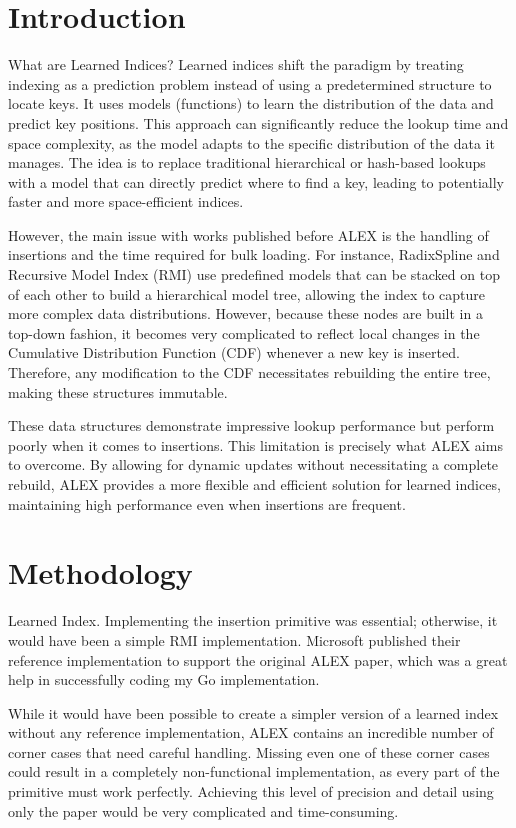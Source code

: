 \chapter{Introduction}
What are Learned Indices?
Learned indices shift the paradigm by treating indexing as a prediction problem instead of using a predetermined structure to locate keys. It uses models (functions) to learn the distribution of the data and predict key positions. This approach can significantly reduce the lookup time and space complexity, as the model adapts to the specific distribution of the data it manages. The idea is to replace traditional hierarchical or hash-based lookups with a model that can directly predict where to find a key, leading to potentially faster and more space-efficient indices.

However, the main issue with works published before ALEX is the handling of insertions and the time required for bulk loading. For instance, RadixSpline and Recursive Model Index (RMI) \cite{46518} use predefined models that can be stacked on top of each other to build a hierarchical model tree, allowing the index to capture more complex data distributions. However, because these nodes are built in a top-down fashion, it becomes very complicated to reflect local changes in the Cumulative Distribution Function (CDF) whenever a new key is inserted. Therefore, any modification to the CDF necessitates rebuilding the entire tree, making these structures immutable.

These data structures demonstrate impressive lookup performance but perform poorly when it comes to insertions. This limitation is precisely what ALEX aims to overcome. By allowing for dynamic updates without necessitating a complete rebuild, ALEX provides a more flexible and efficient solution for learned indices, maintaining high performance even when insertions are frequent.

\let\clearpage\relax
\chapter{Methodology}
Learned Index. Implementing the insertion primitive was essential; otherwise, it would have been a simple RMI implementation. Microsoft published their reference implementation to support the original ALEX paper, which was a great help in successfully coding my Go implementation.

While it would have been possible to create a simpler version of a learned index without any reference implementation, ALEX contains an incredible number of corner cases that need careful handling. Missing even one of these corner cases could result in a completely non-functional implementation, as every part of the primitive must work perfectly. Achieving this level of precision and detail using only the paper would be very complicated and time-consuming.

